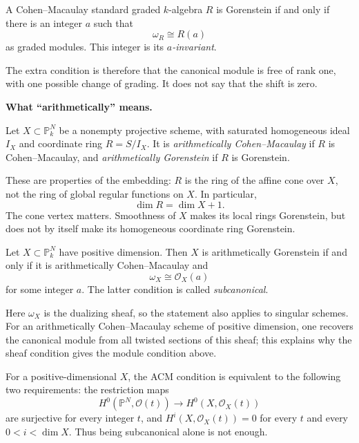 \begin{theorem}
\label{theorem-graded-gorenstein}
A Cohen--Macaulay standard graded
$k$-algebra $R$ is Gorenstein if and only if
there is an integer $a$ such that
$$
\omega_R\cong R(a)
$$
as graded modules.
This integer is its {\it $a$-invariant}.
\end{theorem}

The extra condition is therefore that the
canonical module is free of rank one, with
one possible change of grading. It does not
say that the shift is zero.

\medskip\noindent
{\bf What ``arithmetically'' means.}

\begin{definition}
\label{definition-arithmetically-gorenstein}
Let $X\subset\mathbb P^N_k$ be a nonempty
projective scheme, with saturated homogeneous
ideal $I_X$ and coordinate ring $R=S/I_X$.
It is {\it arithmetically Cohen--Macaulay}
if $R$ is Cohen--Macaulay, and
{\it arithmetically Gorenstein} if $R$ is
Gorenstein.
\end{definition}

These are properties of the embedding:
$R$ is the ring of the affine cone over $X$,
not the ring of global regular functions
on $X$. In particular,
$$
\dim R=\dim X+1.
$$
The cone vertex matters. Smoothness of $X$
makes its local rings Gorenstein, but does
not by itself make its homogeneous
coordinate ring Gorenstein.

\begin{theorem}
\label{theorem-ag-subcanonical}
Let $X\subset\mathbb P^N_k$ have positive
dimension. Then $X$ is arithmetically
Gorenstein if and only if it is
arithmetically Cohen--Macaulay and
$$
\omega_X\cong\mathcal O_X(a)
$$
for some integer $a$.
The latter condition is called
{\it subcanonical}.
\end{theorem}

Here $\omega_X$ is the dualizing sheaf,
so the statement also applies to singular
schemes. For an arithmetically
Cohen--Macaulay scheme of positive dimension,
one recovers the canonical module from all
twisted sections of this sheaf; this explains
why the sheaf condition gives the module
condition above.

For a positive-dimensional $X$, the ACM
condition is equivalent to the following
two requirements: the restriction maps
$$
H^0(\mathbb P^N,\mathcal O(t))
\longrightarrow H^0(X,\mathcal O_X(t))
$$
are surjective for every integer $t$, and
$H^i(X,\mathcal O_X(t))=0$ for every $t$
and every $0<i<\dim X$.
Thus being subcanonical alone is not enough.

